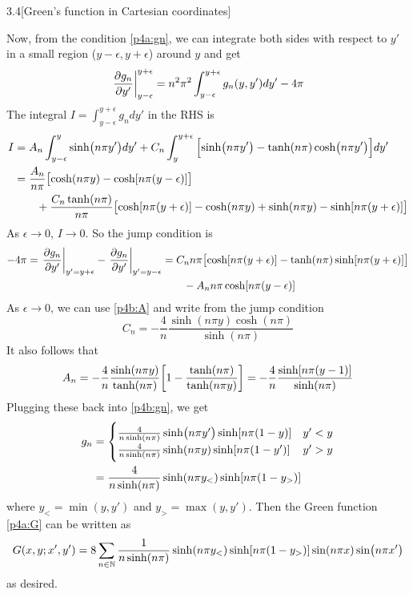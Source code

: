 \documentclass[12pt]{article}
\begin{document}
\begin{problem}{3.4}[Green's function in Cartesian coordinates]
\begin{solution}
    Now, from the condition \eqref{p4a:gn}, we can integrate both sides with
    respect to $y'$ in a small region ($y-\epsilon,y+\epsilon$) around $y$ and 
    get
    \begin{equation}
        \eval{\frac{\partial g_n}{\partial y'}}_{y-\epsilon}^{y+\epsilon}
        =n^2\pi^2\int_{y-\epsilon}^{y+\epsilon}g_n(y,y')dy'-4\pi
    \end{equation}
    The integral $I=\int_{y-\epsilon}^{y+\epsilon}g_ndy'$ in the RHS is
    \begin{align}
        I
        &=A_n\int_{y-\epsilon}^y\sinh(n\pi
        y')dy'+C_n\int_y^{y+\epsilon}\qty[\sinh(n\pi y')-\tanh(n\pi)\cosh(n\pi
        y')]dy'\notag\\
        &=\frac{A_n}{n\pi}\qty[\cosh(n\pi y)-\cosh[n\pi(y-\epsilon)]]\notag\\
        &\qquad+\frac{C_n\tanh(n\pi)}{n\pi}\qty[\cosh[n\pi(y+\epsilon)]-\cosh(n\pi
        y)+\sinh(n\pi y)-\sinh[n\pi(y+\epsilon)]]
    \end{align}
    As $\epsilon\to0$, $I\to0$. So the jump condition is
    \begin{align}
        -4\pi=\eval{\frac{\partial g_n}{\partial
        y'}}_{y'=y+\epsilon}-\eval{\frac{\partial g_n}{\partial
y'}}_{y'=y-\epsilon}
        &=C_nn\pi\qty[\cosh[n\pi(y+\epsilon)]-\tanh(n\pi)\sinh[n\pi(y+\epsilon)]]\notag\\
        &\qquad-A_nn\pi\cosh[n\pi(y-\epsilon)]
    \end{align}
    As $\epsilon\to0$, we can use \eqref{p4b:A} and write from the jump
    condition
    \begin{equation}
        C_n=-\frac{4}{n}\frac{\sinh(n\pi y)\cosh(n\pi)}{\sinh(n\pi)}
    \end{equation}
    It also follows that
    \begin{equation}
        A_n=-\frac4{n}\frac{\sinh(n\pi
        y)}{\tanh(n\pi)}\qty[1-\frac{\tanh(n\pi)}{\tanh(n\pi y)}]
        =-\frac{4}{n}\frac{\sinh[n\pi(y-1)]}{\sinh(n\pi)}
    \end{equation}
    Plugging these back into \eqref{p4b:gn}, we get
    \begin{align}
        g_n&=\begin{cases}
            \frac{4}{n\sinh(n\pi)}\sinh(n\pi y')\sinh[n\pi(1-y)] & y'<y\\
            \frac{4}{n\sinh(n\pi)}\sinh(n\pi y)\sinh[n\pi(1-y')] & y'>y
        \end{cases}\notag\\
           &=\frac4{n\sinh(n\pi)}\sinh(n\pi y_<)\sinh[n\pi(1-y_>)]
    \end{align}
    where $y_<=\min(y,y')$ and $y_>=\max(y,y')$. Then the Green function
    \eqref{p4a:G} can be written as
    \begin{equation}
        G(x,y;x',y')=8\sum_{n\in\mathbb{N}}\frac{1}{n\sinh(n\pi)}\sinh(n\pi
        y_<)\sinh[n\pi(1-y_>)]\sin(n\pi x)\sin(n\pi x') 
    \end{equation}
    as desired.
\end{solution}
\end{problem}
\end{document}
